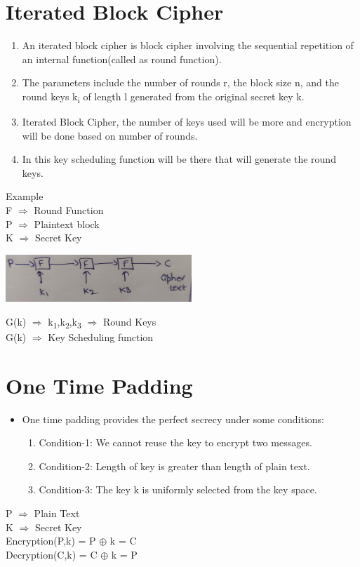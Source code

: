 \documentclass[11pt]{article}
\begin{document}
	\section{Iterated Block Cipher}
	
	\begin{enumerate}
		\item An iterated block cipher is block cipher involving the sequential repetition of an internal function(called as round function).
		\item The parameters include the number of rounds r, the block size n, and the round keys k\textsubscript{i} of length l generated from the original secret key k.
		\item Iterated Block Cipher, the number of keys used will be more and encryption will be done based on number of rounds. 
		\item In this key scheduling function will be there that will generate the round keys.
	\end{enumerate} 
	Example \\
	F $\Rightarrow$ Round Function\\
	P $\Rightarrow$ Plaintext block\\
	K  $\Rightarrow$ Secret Key\vspace{0.1cm}\\
	\begin{center}
		\includegraphics[width = 7cm]{IBC.jpg}\vspace{0.1cm}\\
	\end{center}
	G(k) $\Rightarrow$ k\textsubscript{1},k\textsubscript{2},k\textsubscript{3} $\Rightarrow$ Round Keys\\
	G(k) $\Rightarrow$ Key Scheduling function 
	\section{One Time Padding} 
	\begin{itemize} 
		\item One time padding provides the perfect secrecy under some conditions:
		\begin{enumerate}
			\item Condition-1: We cannot reuse the key to encrypt two messages.
			\item Condition-2: Length of key is greater than length of plain text.
			\item Condition-3: The key k is uniformly selected from the key space.
		\end{enumerate}
	\end{itemize}
	P $\Rightarrow$ Plain Text\\
	K $\Rightarrow$ Secret Key\vspace{0.2cm}\\
	Encryption(P,k) = P $\oplus$ k = C\\
	Decryption(C,k) = C $\oplus$ k = P
	
\end{document}
